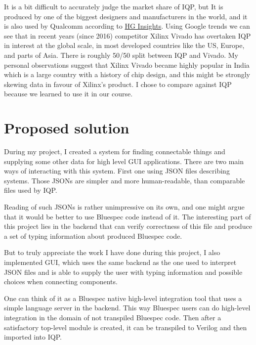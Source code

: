 \documentclass[12pt]{report}
\begin{document}
\begin{tcolorbox}[title=Market share and justification for focusing entirely on comparisons with Intel Quartus Prime]
    It is a bit difficult to accurately judge the market share of IQP, but It is produced by one of the biggest designers and manufacturers in the world, and it is also used by Qualcomm according to \href{https://discovery.hgdata.com/product/intel-quartus-prime}{HG Insights}. Using Google trends we can see that in recent years (since 2016) competitor Xilinx Vivado has overtaken IQP in interest at the global scale, in most developed countries like the US, Europe, and parts of Asia. There is roughly 50/50 split between IQP and Vivado. My personal observations suggest that Xilinx Vivado became highly popular in India which is a large country with a history of chip design, and this might be strongly skewing data in favour of Xilinx's product. I chose to compare against IQP because we learned to use it in our course.
\end{tcolorbox}

\section{Proposed solution}
During my project, I created a system for finding connectable things and supplying some other data for high level GUI applications. There are two main ways of interacting with this system. First one using JSON files describing systems. Those JSONs are simpler and more human-readable, than comparable files used by IQP. 

Reading of such JSONs is rather unimpressive on its own, and one might argue that it would be better to use Bluespec code instead of it. The interesting part of this project lies in the backend that can verify correctness of this file and produce a set of typing information about produced Bluespec code.  

But to truly appreciate the work I have done during this project, I also implemented GUI, which uses the same backend as the one used to interpret JSON files and is able to supply the user with typing information and possible choices when connecting components.  

One can think of it as a Bluespec native high-level integration tool that uses a simple language server in the backend. This way Bluespec users can do high-level integration in the domain of not transpiled Bluespec code. Then after a satisfactory top-level module is created, it can be transpiled to Verilog and then imported into IQP. 
\end{document}

